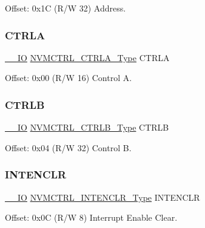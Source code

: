 Offset\+: 0x1C (R/W 32) Address. 

\mbox{\label{struct_nvmctrl_abed8e63e79f5f580404555db2fe3687f}} 
\subsubsection{\texorpdfstring{CTRLA}{CTRLA}}
{\footnotesize\ttfamily \mbox{\hyperlink{core__cm0plus_8h_aec43007d9998a0a0e01faede4133d6be}{\+\_\+\+\_\+\+IO}} \mbox{\hyperlink{union_n_v_m_c_t_r_l___c_t_r_l_a___type}{N\+V\+M\+C\+T\+R\+L\+\_\+\+C\+T\+R\+L\+A\+\_\+\+Type}} C\+T\+R\+LA}



Offset\+: 0x00 (R/W 16) Control A. 

\mbox{\label{struct_nvmctrl_a6ce397bffd9c81063a72fb9947dd8163}} 
\subsubsection{\texorpdfstring{CTRLB}{CTRLB}}
{\footnotesize\ttfamily \mbox{\hyperlink{core__cm0plus_8h_aec43007d9998a0a0e01faede4133d6be}{\+\_\+\+\_\+\+IO}} \mbox{\hyperlink{union_n_v_m_c_t_r_l___c_t_r_l_b___type}{N\+V\+M\+C\+T\+R\+L\+\_\+\+C\+T\+R\+L\+B\+\_\+\+Type}} C\+T\+R\+LB}



Offset\+: 0x04 (R/W 32) Control B. 

\mbox{\label{struct_nvmctrl_a8a070b37504a2280dfa92c874cd24466}} 
\subsubsection{\texorpdfstring{INTENCLR}{INTENCLR}}
{\footnotesize\ttfamily \mbox{\hyperlink{core__cm0plus_8h_aec43007d9998a0a0e01faede4133d6be}{\+\_\+\+\_\+\+IO}} \mbox{\hyperlink{union_n_v_m_c_t_r_l___i_n_t_e_n_c_l_r___type}{N\+V\+M\+C\+T\+R\+L\+\_\+\+I\+N\+T\+E\+N\+C\+L\+R\+\_\+\+Type}} I\+N\+T\+E\+N\+C\+LR}



Offset\+: 0x0C (R/W 8) Interrupt Enable Clear. 

\mbox{\label{struct_nvmctrl_ae3337ae94d80c7ace1f0d77ce2e33fed}} 
